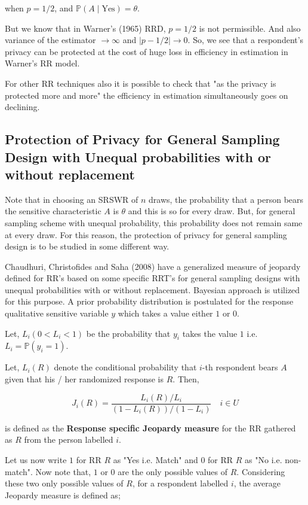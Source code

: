 \documentclass[12pt]{article}
\newcommand{\prob}{\mathbb{P}}
\theoremstyle{definition}
\begin{document}
when $p = 1/2$, and $\prob(A \mid \text{Yes}) = \theta$.

But we know that in Warner's (1965) RRD, $p = 1/2$ is not permissible. And also variance of the estimator $\rightarrow \infty$ and $\vert p - 1/2 \vert \rightarrow 0$. So, we see that a respondent's privacy can be protected at the cost of huge loss in efficiency in estimation in Warner's RR model.

For other RR techniques also it is possible to check that "as the privacy is protected more and more" the efficiency in estimation simultaneously goes on declining.

\subsection{Protection of Privacy for General Sampling Design with Unequal probabilities with or without replacement}

Note that in choosing an SRSWR of $n$ draws, the probability that a person bears the sensitive characteristic $A$ is $\theta$ and this is so for every draw. But, for general sampling scheme with unequal probability, this probability does not remain same at every draw. For this reason, the protection of privacy for general sampling design is to be studied in some different way.

Chaudhuri, Christofides and Saha (2008) have a generalized measure of jeopardy defined for RR's based on some specific RRT's for general sampling designs with unequal probabilities with or without replacement. Bayesian approach is utilized for this purpose. A prior probability distribution is postulated for the response qualitative sensitive variable $y$ which takes a value either $1$ or $0$.

Let, $L_i (0 < L_i < 1)$ be the probability that $y_i$ takes the value $1$ i.e. $L_i = \prob(y_i = 1)$.

Let, $L_i(R)$ denote the conditional probability that $i$-th respondent bears $A$ given that his / her randomized response is $R$. Then,

$$J_i(R) = \dfrac{L_i(R) / L_i}{(1 - L_i(R)) / (1 - L_i) } \quad i \in U$$

is defined as the \textbf{Response specific Jeopardy measure} for the RR gathered as $R$ from the person labelled $i$.

Let us now write $1$ for RR $R$ as "Yes i.e. Match" and $0$ for RR $R$ as "No i.e. non-match". Now note that, $1$ or $0$ are the only possible values of $R$.  Considering these two only possible values of $R$, for a respondent labelled $i$, the average Jeopardy measure is defined as;
\end{document}

